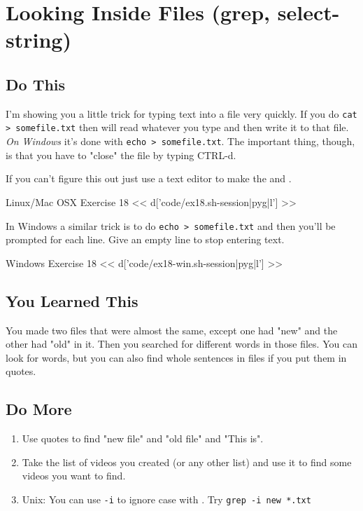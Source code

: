 \chapter{Looking Inside Files (grep, select-string)}

\section{Do This}

I'm showing you a little trick for typing text into a file very quickly.  If
you do \verb|cat > somefile.txt| then  will read whatever you type
and then write it to that file.  \emph{On Windows} it's done with \verb|echo > somefile.txt|.
The important thing, though, is that you have to "close" the
file by typing CTRL-d.

If you can't figure this out just use a text editor to make the
 and .

\begin{code}{Linux/Mac OSX Exercise 18}
<< d['code/ex18.sh-session|pyg|l'] >>
\end{code}

In Windows a similar trick is to do \verb|echo > somefile.txt| and then you'll
be prompted for each line.  Give an empty line to stop entering text.

\begin{code}{Windows Exercise 18}
<< d['code/ex18-win.sh-session|pyg|l'] >>
\end{code}

\section{You Learned This}

You made two files that were almost the same, except one had "new" and the other 
had "old" in it.  Then you searched for different words in those files.  You can look for words, but you can also find whole sentences in
files if you put them in quotes.

\section{Do More}

\begin{enumerate}
\item Use quotes to find "new file" and "old file" and "This is".
\item Take the list of videos you created (or any other list) and use it to find some videos you want to find.
\item Unix: You can use \verb|-i| to ignore case with .  Try \verb|grep -i new *.txt|
\end{enumerate}

